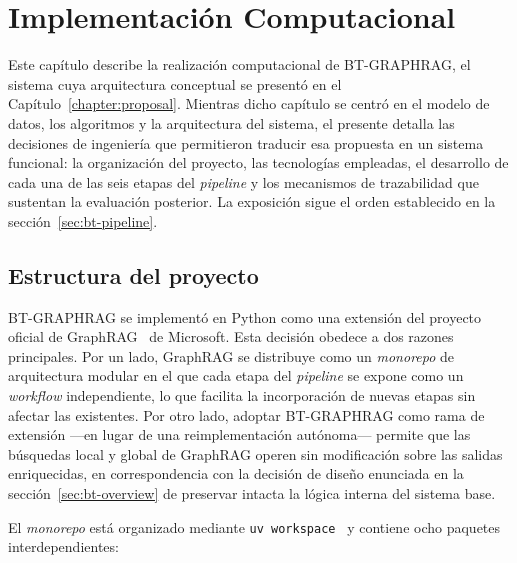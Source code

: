 \chapter{Implementación Computacional}\label{chapter:implementation}

Este capítulo describe la realización computacional de BT-GRAPHRAG, el sistema cuya arquitectura conceptual se presentó en el Capítulo~\ref{chapter:proposal}. Mientras dicho capítulo se centró en el modelo de datos, los algoritmos y la arquitectura del sistema, el presente detalla las decisiones de ingeniería que permitieron traducir esa propuesta en un sistema funcional: la organización del proyecto, las tecnologías empleadas, el desarrollo de cada una de las seis etapas del \emph{pipeline} y los mecanismos de trazabilidad que sustentan la evaluación posterior. La exposición sigue el orden establecido en la sección~\ref{sec:bt-pipeline}.

\section{Estructura del proyecto}\label{sec:impl-project-structure}

BT-GRAPHRAG se implementó en Python como una extensión del proyecto oficial de GraphRAG~\cite{edge2024local} de Microsoft. Esta decisión obedece a dos razones principales. Por un lado, GraphRAG se distribuye como un \emph{monorepo} de arquitectura modular en el que cada etapa del \emph{pipeline} se expone como un \emph{workflow} independiente, lo que facilita la incorporación de nuevas etapas sin afectar las existentes. Por otro lado, adoptar BT-GRAPHRAG como rama de extensión ---en lugar de una reimplementación autónoma--- permite que las búsquedas local y global de GraphRAG operen sin modificación sobre las salidas enriquecidas, en correspondencia con la decisión de diseño enunciada en la sección~\ref{sec:bt-overview} de preservar intacta la lógica interna del sistema base.

El \emph{monorepo} está organizado mediante \texttt{uv workspace}~\cite{TODO_uv_workspace} y contiene ocho paquetes interdependientes:

